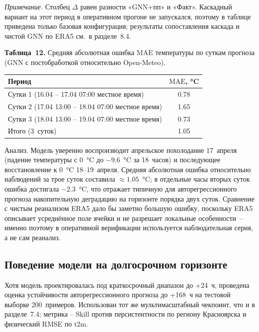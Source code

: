 \documentclass[14pt,a4paper]{extarticle}
\newcounter{none}
\numberwithin{table}{section}
\numberwithin{figure}{section}
\numberwithin{equation}{section}
\begin{document}
\textit{Примечание.} Столбец $\Delta$ равен разности «GNN+пп» и
«Факт». Каскадный вариант на этот период в оперативном прогоне не
запускался, поэтому в таблице приведена только базовая конфигурация;
результаты сопоставления каскада и чистой GNN по ERA5 см.\ в
разделе~8.4.

\textbf{Таблица~12.} Средняя абсолютная ошибка $\text{MAE}$ температуры
по суткам прогноза (GNN с постобработкой относительно Open-Meteo).

{\def\LTcaptype{none}
\begin{longtable}[]{@{}lc@{}}
\toprule\noalign{}
Период & $\text{MAE}$, °C \\
\midrule\noalign{}
\endhead
\bottomrule\noalign{}
\endlastfoot
Сутки 1 (16.04 -- 17.04 07:00 местное время) & 0.78 \\
Сутки 2 (17.04 13:00 -- 18.04 07:00 местное время) & 1.65 \\
Сутки 3 (18.04 13:00 -- 19.04 07:00 местное время) & 0.73 \\
Итого (3~суток) & 1.05 \\
\end{longtable}
}

Анализ. Модель уверенно воспроизводит апрельское похолодание
17~апреля (падение температуры с $0$~°C до $-9.6$~°C за 18~часов) и
последующее восстановление к $0$~°C 18--19~апреля. Средняя абсолютная
ошибка относительно наблюдений за трое суток составила
$\approx 1.05$~°C; в отдельные часы вторых суток ошибка достигала
$-2.3$~°C, что отражает типичную для авторегрессионного прогноза
накопительную деградацию на горизонте порядка двух суток. Сравнение
с чистым реанализом ERA5 дало бы заметно большую ошибку, поскольку ERA5 описывает
усреднённое поле ячейки и не разрешает локальные особенности~-- именно поэтому в
оперативной верификации используется наблюдательная серия, а не
сам реанализ.

\subsection{Поведение модели на долгосрочном горизонте}\label{ux434ux43eux43bux433ux43eux441ux440ux43eux447ux43dux44bux439-ux433ux43eux440ux438ux437ux43eux43dux442}

Хотя модель проектировалась под краткосрочный диапазон до +24~ч,
проведена оценка устойчивости авторегрессионного прогноза до +168~ч на
тестовой выборке 200~примеров. Использован тот же
мультимасштабный чекпоинт, что и в разделе~7.4; метрика -- Skill против
персистентности по региону Красноярска и физический RMSE по t2m.
\end{document}
